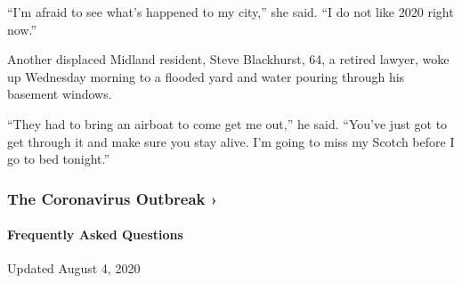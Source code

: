 ``I'm afraid to see what's happened to my city,'' she said. ``I do not
like 2020 right now.''

Another displaced Midland resident, Steve Blackhurst, 64, a retired
lawyer, woke up Wednesday morning to a flooded yard and water pouring
through his basement windows.

``They had to bring an airboat to come get me out,'' he said. ``You've
just got to get through it and make sure you stay alive. I'm going to
miss my Scotch before I go to bed tonight.''

\href{https://www.nytimes3xbfgragh.onion/news-event/coronavirus?action=click\&pgtype=Article\&state=default\&region=MAIN_CONTENT_3\&context=storylines_faq}{}

\hypertarget{the-coronavirus-outbreak-}{%
\subsubsection{The Coronavirus Outbreak
›}\label{the-coronavirus-outbreak-}}

\hypertarget{frequently-asked-questions}{%
\paragraph{Frequently Asked
Questions}\label{frequently-asked-questions}}

Updated August 4, 2020

